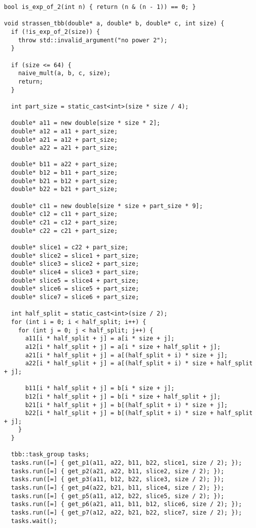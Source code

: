\documentclass{report}
\begin{document}
\begin{lstlisting}
bool is_exp_of_2(int n) { return (n & (n - 1)) == 0; }

void strassen_tbb(double* a, double* b, double* c, int size) {
  if (!is_exp_of_2(size)) {
    throw std::invalid_argument("no power 2");
  }

  if (size <= 64) {
    naive_mult(a, b, c, size);
    return;
  }

  int part_size = static_cast<int>(size * size / 4);

  double* a11 = new double[size * size * 2];
  double* a12 = a11 + part_size;
  double* a21 = a12 + part_size;
  double* a22 = a21 + part_size;

  double* b11 = a22 + part_size;
  double* b12 = b11 + part_size;
  double* b21 = b12 + part_size;
  double* b22 = b21 + part_size;

  double* c11 = new double[size * size + part_size * 9];
  double* c12 = c11 + part_size;
  double* c21 = c12 + part_size;
  double* c22 = c21 + part_size;

  double* slice1 = c22 + part_size;
  double* slice2 = slice1 + part_size;
  double* slice3 = slice2 + part_size;
  double* slice4 = slice3 + part_size;
  double* slice5 = slice4 + part_size;
  double* slice6 = slice5 + part_size;
  double* slice7 = slice6 + part_size;

  int half_split = static_cast<int>(size / 2);
  for (int i = 0; i < half_split; i++) {
    for (int j = 0; j < half_split; j++) {
      a11[i * half_split + j] = a[i * size + j];
      a12[i * half_split + j] = a[i * size + half_split + j];
      a21[i * half_split + j] = a[(half_split + i) * size + j];
      a22[i * half_split + j] = a[(half_split + i) * size + half_split + j];

      b11[i * half_split + j] = b[i * size + j];
      b12[i * half_split + j] = b[i * size + half_split + j];
      b21[i * half_split + j] = b[(half_split + i) * size + j];
      b22[i * half_split + j] = b[(half_split + i) * size + half_split + j];
    }
  }

  tbb::task_group tasks;
  tasks.run([=] { get_p1(a11, a22, b11, b22, slice1, size / 2); });
  tasks.run([=] { get_p2(a21, a22, b11, slice2, size / 2); });
  tasks.run([=] { get_p3(a11, b12, b22, slice3, size / 2); });
  tasks.run([=] { get_p4(a22, b21, b11, slice4, size / 2); });
  tasks.run([=] { get_p5(a11, a12, b22, slice5, size / 2); });
  tasks.run([=] { get_p6(a21, a11, b11, b12, slice6, size / 2); });
  tasks.run([=] { get_p7(a12, a22, b21, b22, slice7, size / 2); });
  tasks.wait();


\end{lstlisting}
\end{document}
